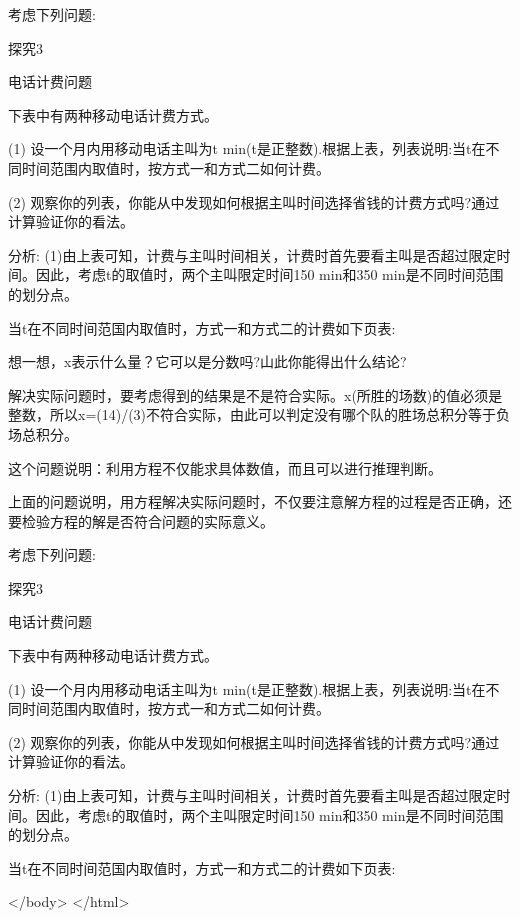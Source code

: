 考虑下列问题:

探究3

电话计费问题

下表中有两种移动电话计费方式。

(1) 设一个月内用移动电话主叫为t min(t是正整数).根据上表，列表说明:当t在不同时间范围内取值时，按方式一和方式二如何计费。

(2) 观察你的列表，你能从中发现如何根据主叫时间选择省钱的计费方式吗?通过计算验证你的看法。

分析: (1)由上表可知，计费与主叫时间相关，计费时首先要看主叫是否超过限定时间。因此，考虑t的取值时，两个主叫限定时间150 min和350 min是不同时间范围的划分点。

当t在不同时间范国内取值时，方式一和方式二的计费如下页表:

想一想，x表示什么量？它可以是分数吗?山此你能得出什么结论?

解决实际问题时，要考虑得到的结果是不是符合实际。x(所胜的场数)的值必须是整数，所以x=(14)/(3)不符合实际，由此可以判定没有哪个队的胜场总积分等于负场总积分。

这个问题说明：利用方程不仅能求具体数值，而且可以进行推理判断。

上面的问题说明，用方程解决实际问题时，不仅要注意解方程的过程是否正确，还要检验方程的解是否符合问题的实际意义。

考虑下列问题:

探究3

电话计费问题

下表中有两种移动电话计费方式。

(1) 设一个月内用移动电话主叫为t min(t是正整数).根据上表，列表说明:当t在不同时间范围内取值时，按方式一和方式二如何计费。

(2) 观察你的列表，你能从中发现如何根据主叫时间选择省钱的计费方式吗?通过计算验证你的看法。

分析: (1)由上表可知，计费与主叫时间相关，计费时首先要看主叫是否超过限定时间。因此，考虑t的取值时，两个主叫限定时间150 min和350 min是不同时间范围的划分点。

当t在不同时间范国内取值时，方式一和方式二的计费如下页表:
\endexample

\enddocument
</body>
</html>
